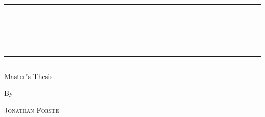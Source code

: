 \begin{titlepage} %

	\centering %
	
	\scshape %
	
	\vspace*{\baselineskip} %
	
	
	\rule{\textwidth}{1.6pt}\vspace*{-\baselineskip}\vspace*{2pt} %
	\rule{\textwidth}{0.4pt} %
	
	\vspace{0.75\baselineskip} %
	
	{\LARGE \textsc{\titleen}\\\\\vspace{0.3cm}\titlede\\} %
	
	\vspace{0.75\baselineskip} %
	
	\rule{\textwidth}{0.4pt}\vspace*{-\baselineskip}\vspace{3.2pt} %
	\rule{\textwidth}{1.6pt} %
	
	\vspace{2\baselineskip} %
	
	Master's Thesis %
	
	\vspace*{3\baselineskip} %
	
	
	By
	
	\vspace{0.5\baselineskip} %
	
	{\scshape\Large Jonathan Förste \\} %


\end{titlepage}
